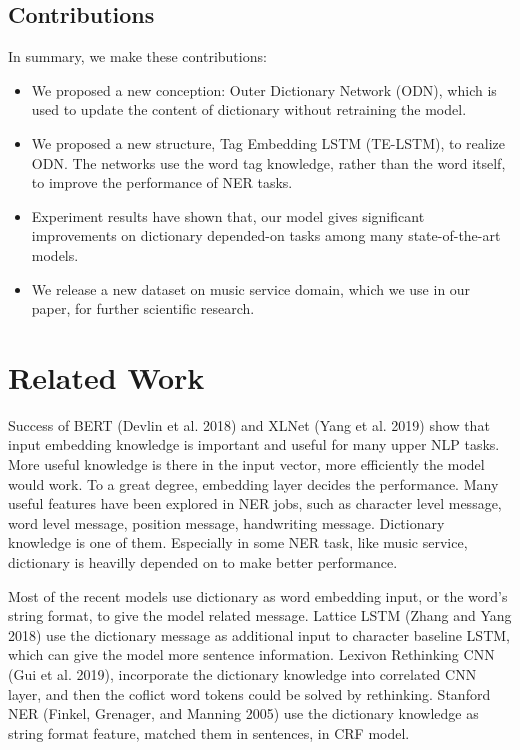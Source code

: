 \documentclass[letterpaper]{article} %
\begin{document}
\subsection{Contributions}

In summary, we make these contributions:

\begin{itemize}
\item We proposed a new conception: Outer Dictionary Network (ODN), which is used to update the content of dictionary without retraining the model.
\item We proposed a new structure, Tag Embedding LSTM (TE-LSTM), to realize ODN. The networks use the word tag knowledge, rather than the word itself, to improve the performance of NER tasks.
\item Experiment results have shown that, our model gives significant improvements on dictionary depended-on tasks among many state-of-the-art models.
\item We release a new dataset on music service domain, which we use in our paper, for further scientific research.
\end{itemize}

\section{Related Work}
Success of BERT (Devlin et al. 2018) and XLNet (Yang et al. 2019) show that input embedding knowledge is important and useful for many upper NLP tasks. More useful knowledge is there in the input vector, more efficiently the model would work. To a great degree, embedding layer decides the performance. Many useful features have been explored in NER jobs, such as character level message, word level message, position message, handwriting message. Dictionary knowledge is one of them. Especially in some NER task, like music service, dictionary is heavilly depended on to make better performance. 

Most of the recent models use dictionary as word embedding input, or the word's string format, to give the model related message. Lattice LSTM (Zhang and Yang 2018) use the dictionary message as additional input to character baseline LSTM, which can give the model more sentence information. Lexivon Rethinking CNN (Gui et al. 2019), incorporate the dictionary knowledge into correlated CNN layer, and then the coflict word tokens could be solved by rethinking. Stanford NER (Finkel, Grenager, and Manning 2005) use the dictionary knowledge as string format feature, matched them in sentences, in CRF model.
\end{document}
